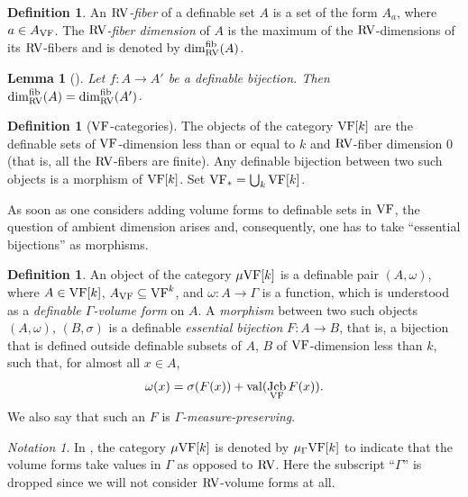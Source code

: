\documentclass[12pt]{amsart}
\newcommand{\memph}[1]{{\color{magenta}\emph{#1}}}
\theoremstyle{plain}
\newtheorem{lem}[thm]{Lemma}
\theoremstyle{definition}
\newtheorem{defn}[thm]{Definition}
\theoremstyle{remark}
\newtheorem{nota}[thm]{Notation}
\numberwithin{equation}{section}
\theoremstyle{plain}
\newcommand{\VF}{\textup{VF}}
\newcommand{\RV}{\textup{RV}}
\DeclareMathOperator{\jcb}{Jcb}
\newcommand{\0}{\emptyset}
\newcommand{\fun}{\longrightarrow}
\newcommand{\sub}{\subseteq}
\newcommand{\mgVF}{{\mu} {\VF}}
\DeclareMathOperator{\vv}{val}
\DeclareMathOperator{\fib}{fib}
\begin{document}
\begin{defn}
An \memph{$\RV$-fiber} of a definable set $A$ is a set of the form $A_a$, where $a \in A_{\VF}$. The \memph{$\RV$-fiber dimension} of $A$ is the maximum of the $\RV$-dimensions of its $\RV$-fibers and is denoted by $\dim^{\fib}_{\RV}(A)$.
\end{defn}


\begin{lem}[{\cite[Lemma~4.13]{Yin:special:trans}}]\label{RV:fiber:dim:same}
Let $f : A \fun A'$ be a definable bijection. Then $\dim^{\fib}_{\RV}(A) = \dim^{\fib}_{\RV} (A')$.
\end{lem}

\begin{defn}[$\VF$-categories]\label{defn:VF:cat}
The objects of the category $\VF[k]$ are the definable sets of $\VF$-dimension less than or equal to $k$ and $\RV$-fiber dimension $0$ (that is, all the $\RV$-fibers are finite). Any definable bijection between two such objects is a morphism of $\VF[k]$. Set $\VF_* = \bigcup_k \VF[k]$.
\end{defn}

As soon as one considers adding volume forms to definable sets in $\VF$, the question of ambient dimension arises and, consequently, one has to take ``essential bijections'' as morphisms.

 \begin{defn}
\label{defn:VF:mu:G}
An object of the category $\mgVF[k]$ is a definable pair $(A, \omega)$, where $A \in \VF[k]$, $A_{\VF} \sub \VF^k$, and $\omega : A \fun \Gamma$ is a function, which is understood as a \memph{definable $\Gamma$-volume form} on $A$. A \memph{morphism} between two such objects $(A, \omega)$, $(B, \sigma)$ is a definable \memph{essential bijection} $F : A \fun B$, that is, a bijection that is defined outside definable subsets of $A$, $B$ of $\VF$-dimension less than $k$, such that, for almost all $x \in A$,
\begin{equation}\label{cond:mg}
\omega(x) = \sigma(F(x)) + \vv(\jcb_{\VF} F(x)).
\end{equation}
We also say that such an $F$ is \memph{$\Gamma$-measure-preserving}.
\end{defn}

\begin{nota}
In \cite{hrushovski:kazhdan:integration:vf}, the category $\mgVF[k]$ is denoted by ${\mu_{\Gamma}}{\VF[k]}$ to indicate that the volume forms take values in $\Gamma$ as opposed to $\RV$. Here the subscript ``$\Gamma$'' is dropped since  we will not consider $\RV$-volume forms at all.
\end{nota}
\end{document}
